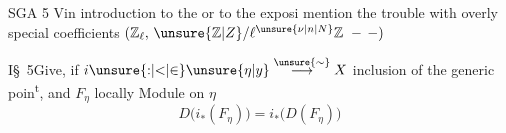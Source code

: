 \noindent SGA 5 \(\mathrm{V}\)\quad in introduction to the  or to the exposi mention the trouble with overly special coefficients \((\mathbb{Z}_{\ell},\,\unsure{\mathbb{Z}|Z}/\ell^{\unsure{\nu|n|N}}\mathbb{Z}\ -\,-)\)


\noindent \(\mathrm{I}\)\quad \S\ 5\qquad Give, if \(i\unsure{{:}|{<}|{\in}}\unsure{\eta|y}\overset{\unsure{\sim}}{\longrightarrow} X\) inclusion of the generic poin\textsuperscript{t}, and \(F_{\eta}\) locally  Module on \(\eta\)
\[
 D\bigl(i_{*}(F_{\eta})\bigr)=i_{*}\bigl(D(F_{\eta})\bigr)
\]
\clearpage
